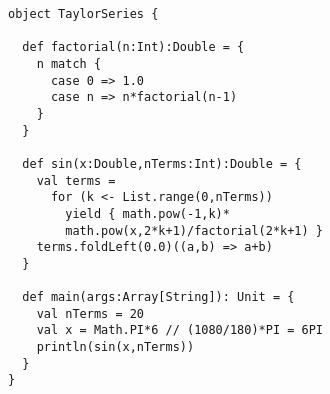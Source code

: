 \documentclass[jou]{apa6}
\begin{document}
{\footnotesize
\begin{verbatim}
object TaylorSeries {

  def factorial(n:Int):Double = {
    n match {
      case 0 => 1.0
      case n => n*factorial(n-1)
    }
  }
    
  def sin(x:Double,nTerms:Int):Double = {
    val terms = 
      for (k <- List.range(0,nTerms)) 
        yield { math.pow(-1,k)*
        math.pow(x,2*k+1)/factorial(2*k+1) } 
    terms.foldLeft(0.0)((a,b) => a+b)
  }
  
  def main(args:Array[String]): Unit = {
    val nTerms = 20
    val x = Math.PI*6 // (1080/180)*PI = 6PI 
    println(sin(x,nTerms))
  }
}
\end{verbatim}
}
\end{document}
